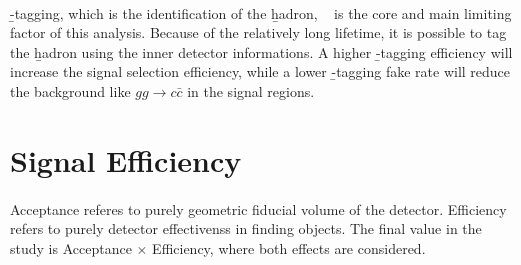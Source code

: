 \paragraph{}
\b-tagging, which is the identification of the \b hadron,  ~\cite{Reco-btag-2016} is the core and main limiting factor of this analysis. Because of the relatively long lifetime, it is possible to tag the \b hadron using the inner detector informations. A higher \b-tagging efficiency will increase the signal selection efficiency, while a lower \b-tagging fake rate will reduce the background like $gg \to c\bar{c}$ in the signal regions.


\section{Signal Efficiency}

\paragraph{}
Acceptance referes to purely geometric fiducial volume of the detector. Efficiency refers to purely detector effectivenss in finding objects. The final value in the study is Acceptance $\times$ Efficiency, where both effects are considered.

















